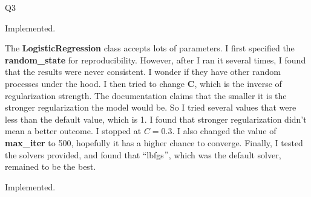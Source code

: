 \question Q3\droppoints

\begin{solution}
     Implemented.

     The \textbf{LogisticRegression} class accepts lots of parameters.
    I first specified the \textbf{random\_state} for reproducibility.
    However, after I ran it several times, I found that the results were never consistent.
    I wonder if they have other random processes under the hood.
    I then tried to change \textbf{C}, which is the inverse of regularization strength.
    The documentation claims that the smaller it is the stronger regularization the model would be.
    So I tried several values that were less than the default value, which is 1.
    I found that stronger regularization didn't mean a better outcome.
    I stopped at $C = 0.3$.
    I also changed the value of \textbf{max\_iter} to 500, hopefully it has a higher chance to
    converge.
    Finally, I tested the solvers provided, and found that ``lbfgs\("\), which was the default solver, remained to be the best.

     Implemented.
\end{solution}
